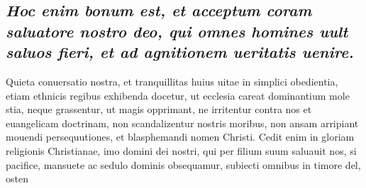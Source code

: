 \documentclass{article}
\begin{document}
\begin{pages}
{}
\subsection*{\textit{Hoc enim bonum est, et acceptum coram saluatore nostro deo, qui omnes homines uult saluos fieri, et ad agnitionem ueritatis uenire. }}\pstart Quieta conuersatio nostra, et tranquillitas huius uitae in simplici obedientia, etiam ethnicis regibus exhibenda docetur, ut ecclesia careat dominantium mole stia, neque grassentur, ut magis opprimant, ne irritentur contra nos et euangelicam doctrinam, non scandalizentur nostris moribus, non ansam arripiant mouendi persequutiones, et blasphemandi nomen Christi. Cedit enim in gloriam religionis Christianae, imo domini dei nostri, qui per filium suum saluauit nos, si pacifice, mansuete ac sedulo dominis obsequamur, subiecti omnibus in timore del, osten\pend

\end{pages}
\end{document}
